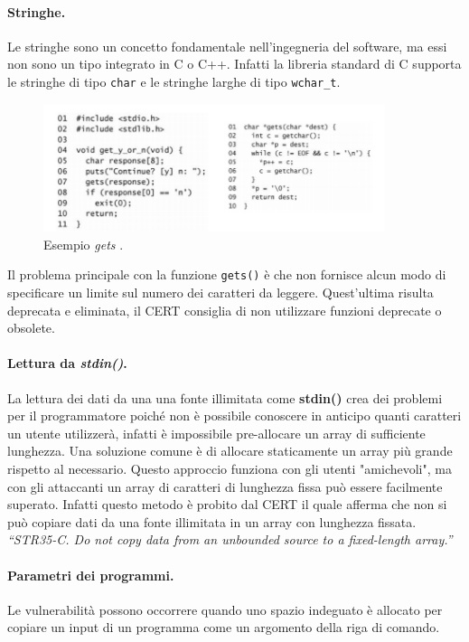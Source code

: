 \paragraph{Stringhe.} Le stringhe sono un concetto fondamentale nell'ingegneria del software, ma essi non sono un tipo integrato in C o C++. Infatti la libreria standard di C supporta le stringhe di tipo \verb|char| e le stringhe larghe di tipo \verb|wchar_t|.
\begin{figure}[H]
    \centering
    \includegraphics[width=10cm, keepaspectratio]{capitoli/secure_coding/img/cap_2/gets_1.png}
    \caption{Esempio \textit{gets} .}\label{fig:gets}
\end{figure}
Il problema principale con la funzione \verb|gets()| è che non fornisce alcun modo di specificare un limite sul numero dei caratteri da leggere.
Quest'ultima risulta deprecata e eliminata, il CERT consiglia di non utilizzare funzioni deprecate o obsolete.

\paragraph{Lettura da \textit{stdin()}.} La lettura dei dati da una una fonte illimitata come \textbf{stdin()} crea dei problemi per il programmatore poiché non è possibile conoscere in anticipo quanti caratteri un utente utilizzerà, infatti è impossibile pre-allocare un array di sufficiente lunghezza. Una soluzione comune è di allocare staticamente un array più grande rispetto al necessario. Questo approccio funziona con gli utenti "amichevoli", ma con gli attaccanti un array di caratteri di lunghezza fissa può essere facilmente superato. Infatti questo metodo è probito dal CERT il quale afferma che non si può copiare dati da una fonte illimitata in un array con lunghezza fissata.\\
\textit{“STR35-C. Do not copy data from an unbounded
    source to a fixed-length array.”}
\paragraph{Parametri dei programmi.} Le vulnerabilità possono occorrere quando uno spazio indeguato è allocato per copiare un input di un programma come un argomento della riga di comando.

